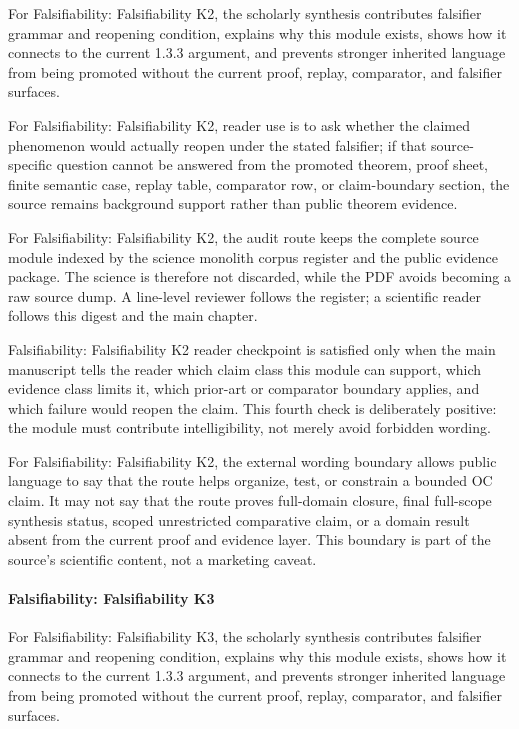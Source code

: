 For Falsifiability: Falsifiability K2, the scholarly synthesis contributes falsifier grammar and reopening condition, explains why this module exists, shows how it connects to the current 1.3.3 argument, and prevents stronger inherited language from being promoted without the current proof, replay, comparator, and falsifier surfaces.


For Falsifiability: Falsifiability K2, reader use is to ask whether the claimed phenomenon would actually reopen under the stated falsifier; if that source-specific question cannot be answered from the promoted theorem, proof sheet, finite semantic case, replay table, comparator row, or claim-boundary section, the source remains background support rather than public theorem evidence.


For Falsifiability: Falsifiability K2, the audit route keeps the complete source module indexed by the science monolith corpus register and the public evidence package. The science is therefore not discarded, while the PDF avoids becoming a raw source dump. A line-level reviewer follows the register; a scientific reader follows this digest and the main chapter.


Falsifiability: Falsifiability K2 reader checkpoint is satisfied only when the main manuscript tells the reader which claim class this module can support, which evidence class limits it, which prior-art or comparator boundary applies, and which failure would reopen the claim. This fourth check is deliberately positive: the module must contribute intelligibility, not merely avoid forbidden wording.


For Falsifiability: Falsifiability K2, the external wording boundary allows public language to say that the route helps organize, test, or constrain a bounded OC claim. It may not say that the route proves full-domain closure, final full-scope synthesis status, scoped unrestricted comparative claim, or a domain result absent from the current proof and evidence layer. This boundary is part of the source's scientific content, not a marketing caveat.


\paragraph{Falsifiability: Falsifiability K3}

For Falsifiability: Falsifiability K3, the scholarly synthesis contributes falsifier grammar and reopening condition, explains why this module exists, shows how it connects to the current 1.3.3 argument, and prevents stronger inherited language from being promoted without the current proof, replay, comparator, and falsifier surfaces.


